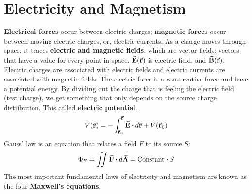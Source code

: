 \section{Electricity and Magnetism}
    \textbf{Electrical forces} occur between electric charges; \textbf{magnetic forces} occur between moving electric charges, or, electric currents. As a charge moves through space, it traces \textbf{electric and magnetic fields}, which are vector fields: vectors that have a value for every point in space. $\va{E}(\va{r})$ is electric field, and $\va{B}(\va{r})$. Electric charges are associated with electric fields and electric currents are associated with magnetic fields. The electric force is a conservative force and have a potential energy. By dividing out the charge that is feeling the electric field (test charge), we get something that only depends on the source charge distribution. This called \textbf{electric potential}.
    \begin{equation*}
        V(\va{r}) = - \int_{\va{r}_0}^{\va{r}}\va{E} \vdot d\va{r} + V(\va{r}_0)
    \end{equation*}
    Gauss' law is an equation that relates a field $F$ to its source $S$:
    \begin{equation*}
        \Phi_F = \iint \va{F} \vdot d\va{A} = \text{Constant} \vdot S
    \end{equation*}
    The most important fundamental laws of electricity and magnetism are known as the four \textbf{Maxwell's equations}.
